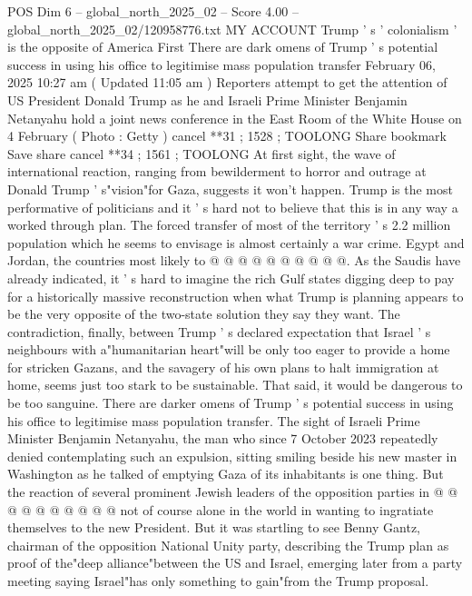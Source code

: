 \begin{textsample}{POS Dim 6 – global\_north\_2025\_02 – Score 4.00 – global\_north\_2025\_02/120958776.txt}  \label{ex:f6_pos_345}
MY ACCOUNT Trump ' s ' colonialism ' is the opposite of America First There are dark omens of Trump ' s potential success in using his office to legitimise mass population transfer February 06, 2025 10:27 am ( Updated 11:05 am ) Reporters attempt to get the attention of US President Donald Trump as he and Israeli Prime Minister Benjamin Netanyahu hold a joint news conference in the East Room of the White House on 4 February ( Photo : Getty ) cancel **31 ; 1528 ; TOOLONG Share bookmark Save share cancel **34 ; 1561 ; TOOLONG At first sight, the wave of international reaction, ranging from bewilderment to horror and outrage at Donald Trump ' s"vision"for Gaza, suggests it won't happen.
Trump is the most performative of politicians and it ' s hard not to believe that this is in any way a worked through plan.
The forced transfer of most of the territory ' s 2.2 million population which he seems to envisage is almost certainly a war crime.
Egypt and Jordan, the countries most likely to @ @ @ @ @ @ @ @ @ @.
As the Saudis have already indicated, it ' s hard to imagine the rich Gulf states digging deep to pay for a historically massive reconstruction when what Trump is planning appears to be the very opposite of the two-state solution they say they want.
The contradiction, finally, between Trump ' s declared expectation that Israel ' s neighbours with a"humanitarian heart"will be only too eager to provide a home for stricken Gazans, and the savagery of his own plans to halt immigration at home, seems just too stark to be sustainable.
That said, it would be dangerous to be too sanguine.
There are darker omens of Trump ' s potential success in using his office to legitimise mass population transfer.
The sight of Israeli Prime Minister Benjamin Netanyahu, the man who since 7 October 2023 repeatedly denied contemplating such an expulsion, sitting smiling beside his new master in Washington as he talked of emptying Gaza of its inhabitants is one thing.
But the reaction of several prominent Jewish leaders of the opposition parties in @ @ @ @ @ @ @ @ @ @ not of course alone in the world in wanting to ingratiate themselves to the new President.
But it was startling to see Benny Gantz, chairman of the opposition National Unity party, describing the Trump plan as proof of the"deep alliance"between the US and Israel, emerging later from a party meeting saying Israel"has only something to gain"from the Trump proposal.

\end{textsample}
